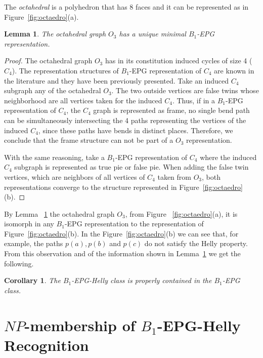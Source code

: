 \documentclass[a4paper,11pt]{article}
\newtheorem{lema}[theorem]{Lemma}
\newtheorem{coro}[theorem]{Corollary}
\begin{document}
The \textit{octahedral} is a polyhedron that has 8 faces and it can be represented as in Figure~\ref{fig:octaedro}(a).

\begin{lema}\label{lem:octaedronaohelly}
The octahedral graph $O_3$ has a unique minimal  $ B_1$-EPG representation.%
\end{lema}
\begin{proof}
The octahedral graph $ O_3 $ has in its constitution induced cycles of size 4 ($ C_4 $). The representation structures of  $ B_1$-EPG representation of $C_4$ are known in the literature and they have been previously presented.
Take an induced $ C_4 $ subgraph  any of the octahedral $ O_3 $. The two outside vertices are false twins whose neighborhood are all vertices taken for the induced $C_4$. Thus, if in a $ B_1$-EPG representation of $C_4$, the $ C_4 $ graph is represented as frame, no single bend path can be simultaneously intersecting the 4 paths representing the vertices of the induced $ C_4 $, since these paths have bends in distinct places. Therefore, we conclude that the frame structure can not be part of a $ O_3 $ representation.

With the same reasoning, take a $ B_1$-EPG representation of $C_4$ where the induced $ C_4 $ subgraph is represented as true pie or false pie. When adding the false twin vertices, which are neighbors of all vertices of $ C_4 $ taken from $ O_3 $, both representations converge to the structure represented in Figure~\ref{fig:octaedro}(b). 
\end{proof}



By Lemma ~\ref{lem:octaedronaohelly} the    octahedral graph $ O_3 $, from Figure ~\ref{fig:octaedro}(a), it is isomorph in any $ B_1$-EPG representation to the representation of Figure~\ref{fig:octaedro}(b). In the Figure~\ref{fig:octaedro}(b) we can see that, for example, the paths $ p(a), p(b) $ and $ p(c) $  do not satisfy the Helly property. From this observation and of the information shown in Lemma~\ref{lem:octaedronaohelly} we get the following. %

\begin{coro}\label{coro:b1hellyisinb1}
The $B_1$-EPG-Helly class is properly contained in the $B_1$-EPG class.
\end{coro}

\section{$NP$-membership of $B_1$-EPG-Helly Recognition}
\end{document}
